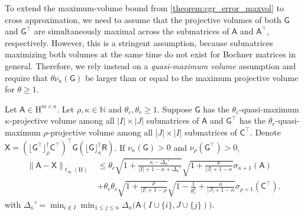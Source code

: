 \documentclass[onefignum,onetabnum]{siamart250211}
\newcommand{\N}{\mathbb{N}}
\newcommand{\Hilb}{\mathrm{H}}
\newcommand{\Batrix}[1]{\bm{\Matrix{#1}}}
\newcommand{\Matrix}[1]{\mathsf{#1}}
\newcommand{\trans}{\intercal}
\newcommand{\pinv}{\dagger}
\newcommand{\truncate}[3][]{#1\lfloor #2 #1\rfloor_{#3}}
\newcommand{\Index}[1]{{#1}}
\newcommand{\Norm}[3][]{#1\| #2 #1\|_{\mathrm{#3}}}
\begin{document}
To extend the maximum-volume bound from \cref{theorem:cgr_error_maxvol} to cross approximation, we need to assume that the projective volumes of both $\Batrix{G}$ and $\Batrix{G}^\trans$ are simultaneously maximal across the submatrices of $\Batrix{A}$ and $\Batrix{A}^\trans$, respectively.
However, this is a stringent assumption, because submatrices maximizing both volumes at the same time do not exist for Bochner matrices in general.
Therefore, we rely instead on a \emph{quasi-maximum volume} assumption and require that $\theta \nu_\kappa(\Batrix{G})$ be larger than or equal to the maximum projective volume for $\theta \geq 1$.

\begin{theorem}
\label{theorem:cross_error_maxvol}
Let $\Batrix{A} \in \Hilb^{m \times n}$. 
Let $\rho,\kappa \in \N$ and $\theta_c, \theta_r \geq 1$.
Suppose $\Batrix{G}$ has the $\theta_c$-quasi-maximum $\kappa$-projective volume among all $|\Index{I}| \times |\Index{J}|$ submatrices of $\Batrix{A}$ and $\Batrix{G}^\trans$ has the $\theta_r$-quasi-maximum $\rho$-projective volume among all $|\Index{J}| \times |\Index{I}|$ submatrices of $\Batrix{C}^\trans$.
Denote $\Batrix{X} = (\truncate{\Batrix{G}^\trans}{\rho}^\pinv \Batrix{C}^\trans)^\trans \Batrix{G} (\truncate{\Batrix{G}}{\kappa}^\pinv \Batrix{R})$.
If $\nu_{\kappa}(\Batrix{G}) > 0$ and $\nu_{\rho}(\Batrix{G}^\trans) > 0$,
\begin{align*}
    \Norm{\Batrix{A} - \Batrix{X}}{\ell_{\infty}(\Hilb)} &\leq \theta_c \sqrt{1 + \frac{\kappa - \Delta_\kappa'}{|\Index{I}| + 1 - \kappa + \Delta_\kappa'}} \sqrt{1 + \frac{\kappa}{|\Index{J}| + 1 - \kappa}} \sigma_{\kappa + 1}(\Batrix{A}) \\
    &+ \theta_r \theta_c \sqrt{1 + \frac{\rho}{|\Index{I}| + 1 - \rho}} \sqrt{1 - \frac{1}{\theta_c^2} + \frac{\kappa}{|\Index{J}| + 1 - \kappa}} \sigma_{\rho + 1}(\Batrix{C}^\trans).
\end{align*}
with $\Delta_\kappa' = \min_{i \not\in \Index{I}} \min_{1 \leq j \leq n} \Delta_{\kappa}\big( \Batrix{A}(\Index{I} \cup \{i\}, \Index{J} \cup \{j\}) \big)$.
\end{theorem}
\end{document}
